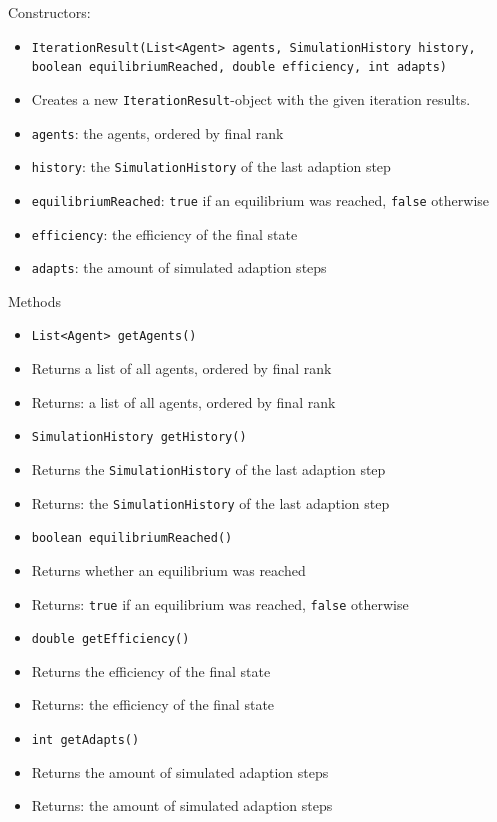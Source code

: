 \documentclass[parskip=full,11pt]{scrartcl}
\begin{document}
Constructors:
\begin{itemize}\itemsep -10pt
\item \texttt{IterationResult(List<Agent> agents, SimulationHistory history, boolean equilibriumReached, double efficiency, int adapts)}
\item[] Creates a new \texttt{IterationResult}-object with the given iteration results.
\item[] \texttt{agents}: the agents, ordered by final rank
\item[] \texttt{history}: the \texttt{SimulationHistory} of the last adaption step
\item[] \texttt{equilibriumReached}: \texttt{true} if an equilibrium was reached, \texttt{false} otherwise
\item[] \texttt{efficiency}: the efficiency of the final state
\item[] \texttt{adapts}: the amount of simulated adaption steps
\end{itemize}

Methods
\begin{itemize}\itemsep -10pt
\item \texttt{List<Agent> getAgents()}
\item[] Returns a list of all agents, ordered by final rank
\item[] Returns: a list of all agents, ordered by final rank

\item \texttt{SimulationHistory getHistory()}
\item[] Returns the \texttt{SimulationHistory} of the last adaption step
\item[] Returns: the \texttt{SimulationHistory} of the last adaption step

\item \texttt{boolean equilibriumReached()}
\item[] Returns whether an equilibrium was reached
\item[] Returns: \texttt{true} if an equilibrium was reached, \texttt{false} otherwise

\item \texttt{double getEfficiency()}
\item[] Returns the efficiency of the final state
\item[] Returns: the efficiency of the final state

\item \texttt{int getAdapts()}
\item[] Returns the amount of simulated adaption steps
\item[] Returns: the amount of simulated adaption steps
\end{itemize}
\end{document}

